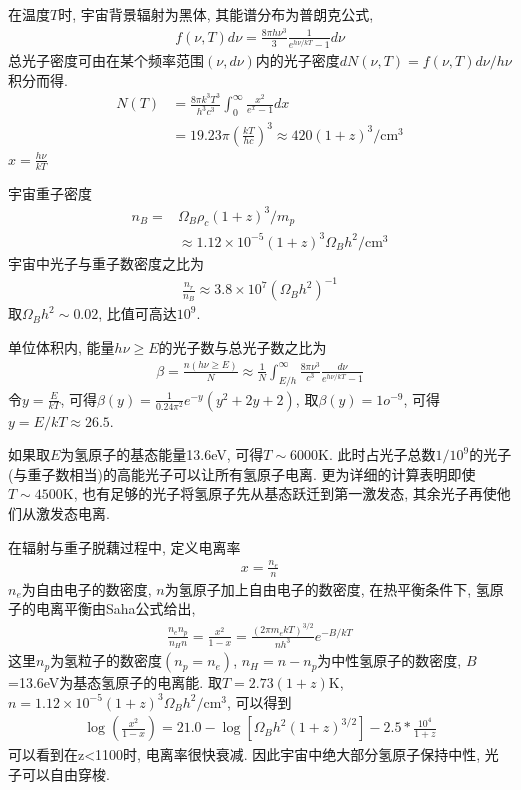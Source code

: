 在温度$T$时, 宇宙背景辐射为黑体, 其能谱分布为普朗克公式, 
\begin{align*}
    f(\nu, T)d \nu=\frac{8 \pi h \nu^3}{3}\frac{1}{e^{h\nu /kT}-1}d\nu
\end{align*}
总光子密度可由在某个频率范围$(\nu, d\nu)$内的光子密度$dN(\nu, T)=f(\nu, T)d\nu /h\nu$积分而得. 
\begin{align*}
    N(T)&=\frac{8\pi k^3 T^3}{h^3 c^3}\int_0^\infty \frac{x^2}{e^x -1}dx \\
    &=19.23\pi\left( \frac{kT}{hc} \right)^3 \approx 420(1+z)^3/\text{cm}^3
\end{align*}
$x=\frac{h\nu}{kT}$

宇宙重子密度
\begin{align*}
    n_B=&\Omega_B\rho_c(1+z)^3/m_p\\
    &\approx 1.12\times 10^{-5}(1+z)^3\Omega_B h^2/\text{cm}^3
\end{align*}
宇宙中光子与重子数密度之比为
\begin{align*}
    \frac{n_r}{n_B}\approx 3.8\times 10^7 (\Omega_B h^2)^{-1}
\end{align*}
取$\Omega_B h^2\sim 0.02$, 比值可高达$10^9$. 

单位体积内, 能量$h\nu \ge E$的光子数与总光子数之比为
\begin{align*}
    \beta=\frac{n(h\nu \ge E)}{N}\approx \frac{1}{N}\int_{E/h}^\infty \frac{8\pi \nu^3}{c^3}\frac{d \nu}{e^{h\nu/kT}-1}
\end{align*}
令$y=\frac{E}{kT}$, 可得$\beta(y)=\frac{1}{0.24\pi^2}e^{-y}(y^2+2y+2)$, 取$\beta(y)=1o^{-9}$, 可得$y=E/kT\approx 26.5$. 

如果取$E$为氢原子的基态能量13.6eV, 可得$T\sim 6000$K. 此时占光子总数$1/10^9$的光子(与重子数相当)的高能光子可以让所有氢原子电离. 更为详细的计算表明即使$T\sim 4500$K, 也有足够的光子将氢原子先从基态跃迁到第一激发态, 其余光子再使他们从激发态电离. 

在辐射与重子脱藕过程中, 定义电离率
\begin{align*}
    x=\frac{n_e}{n}
\end{align*}
$n_e$为自由电子的数密度, $n$为氢原子加上自由电子的数密度, 在热平衡条件下, 氢原子的电离平衡由Saha公式给出, 
\begin{align*}
    \frac{n_e n_p}{n_H n}=\frac{x^2}{1-x}=\frac{(2\pi m_e kT)^{3/2}}{nh^3}e^{-B/kT}
\end{align*}
这里$n_p$为氢粒子的数密度$(n_p=n_e)$, $n_H=n-n_p$为中性氢原子的数密度, $B$=13.6eV为基态氢原子的电离能. 取$T=2.73(1+z)$K, $n=1.12\times 10^{-5}(1+z)^3\Omega_B h^2 /\text{cm}^3$, 可以得到
\begin{align*}
    \log\left( \frac{x^2}{1-x} \right)=21.0-\log\left[ \Omega_B h^2(1+z)^{3/2} \right]-2.5*\frac{10^4}{1+z}
\end{align*}
可以看到在z<1100时, 电离率很快衰减. 因此宇宙中绝大部分氢原子保持中性, 光子可以自由穿梭. 

